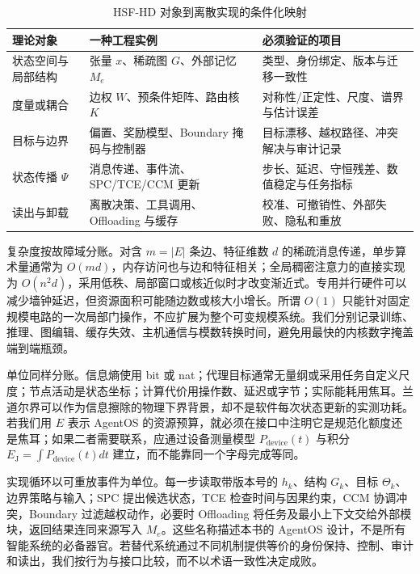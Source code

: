 \begin{table}[htbp]
\centering
\footnotesize
\caption{HSF-HD 对象到离散实现的条件化映射}
\label{tab:reduction_implementation_map}
\begin{tabularx}{\textwidth}{l X X}
\toprule
\rowcolor{structurecolor!20} 理论对象 & 一种工程实例 & 必须验证的项目 \\
\midrule
状态空间与局部结构 & 张量 $x$、稀疏图 $G$、外部记忆 $M_e$ & 类型、身份绑定、版本与迁移一致性 \\
度量或耦合 & 边权 $W$、预条件矩阵、路由核 $K$ & 对称性/正定性、尺度、谱界与估计误差 \\
目标与边界 & 偏置、奖励模型、Boundary 掩码与控制器 & 目标漂移、越权路径、冲突解决与审计记录 \\
状态传播 $\Psi$ & 消息传递、事件流、SPC/TCE/CCM 更新 & 步长、延迟、守恒残差、数值稳定与任务指标 \\
读出与卸载 & 离散决策、工具调用、Offloading 与缓存 & 校准、可撤销性、外部失败、隐私和重放 \\
\bottomrule
\end{tabularx}
\end{table}

复杂度按故障域分账。对含 $m=|E|$ 条边、特征维数 $d$ 的稀疏消息传递，单步算术量通常为 $O(md)$，内存访问也与边和特征相关；全局稠密注意力的直接实现为 $O(n^2d)$，采用低秩、局部窗口或核近似时才改变渐近式。专用并行硬件可以减少墙钟延迟，但资源面积可能随边数或核大小增长。所谓 $O(1)$ 只能针对固定规模电路的一次局部门操作，不应扩展为整个可变规模系统。我们分别记录训练、推理、图编辑、缓存失效、主机通信与模数转换时间，避免用最快的内核数字掩盖端到端瓶颈。

单位同样分账。信息熵使用 bit 或 nat；代理目标通常无量纲或采用任务自定义尺度；节点活动是状态坐标；计算代价用操作数、延迟或字节；实际能耗用焦耳。兰道尔界可以作为信息擦除的物理下界背景，却不是软件每次状态更新的实测功耗。若我们用 $E$ 表示 AgentOS 的资源预算，就必须在接口中注明它是规范化额度还是焦耳；如果二者需要联系，应通过设备测量模型 $P_{\mathrm{device}}(t)$ 与积分 $E_{\mathrm{J}}=\int P_{\mathrm{device}}(t)dt$ 建立，而不能靠同一个字母完成等同。

实现循环以可重放事件为单位。每一步读取带版本号的 $h_k$、结构 $G_k$、目标 $\Theta_k$、边界策略与输入；SPC 提出候选状态，TCE 检查时间与因果约束，CCM 协调冲突，Boundary 过滤越权动作，必要时 Offloading 将任务及最小上下文交给外部模块，返回结果连同来源写入 $M_e$。这些名称描述本书的 AgentOS 设计，不是所有智能系统的必备器官。若替代系统通过不同机制提供等价的身份保持、控制、审计和读出，我们按行为与接口比较，而不以术语一致性决定成败。

